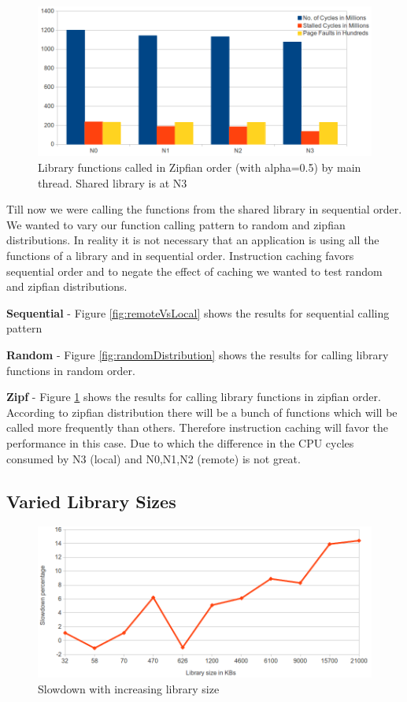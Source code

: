 \begin{figure}
    \centering
    \includegraphics[scale=0.38]{zipfDistribution.png}
    \caption{Library functions called in Zipfian order (with alpha=0.5) by main thread. Shared library is at N3 }
    \label{fig:zipfDistribution}
\end{figure}

Till now we were calling the functions from the shared library in sequential order.
We wanted to vary our function calling pattern to random and zipfian distributions.
In reality it is not necessary that an application is using all the functions of a library and in sequential order.
Instruction caching favors sequential order and to negate the effect of caching we wanted to test random and zipfian distributions.

\textbf{Sequential} - Figure \ref{fig:remoteVsLocal} shows the results for sequential calling pattern

\textbf{Random} - Figure \ref{fig:randomDistribution} shows the results for calling library functions in random order.

\textbf{Zipf} - Figure \ref{fig:zipfDistribution} shows the results for calling library functions in zipfian order.
According to zipfian distribution there will be a bunch of functions which will be called more frequently than others.
Therefore instruction caching will favor the performance in this case.
Due to which the difference in the CPU cycles consumed by N3 (local) and N0,N1,N2 (remote) is not great.


\subsection{Varied Library Sizes}

\begin{figure}
    \centering
    \includegraphics[scale=0.39]{slowdownWithSize.png}
    \caption{Slowdown with increasing library size }
    \label{fig:slowdownWithSize.png}
\end{figure}

